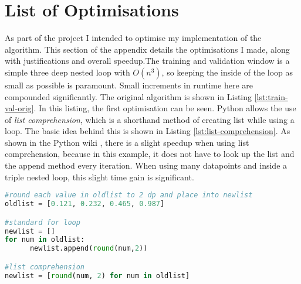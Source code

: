 \documentclass[ oneside,%
                    author={Joshua Felmeden},
                    degree={MEng},
                     title={Sentiment Analysis of Financial Headlines Based on Realised Stock Returns},
                  subtitle={Research}]{dissertation}
\begin{document}


\chapter{List of Optimisations}
\label{appx:optimisations}
As part of the project I intended to optimise my implementation of the algorithm. This section of the appendix details the optimisations I made, along with justifications and overall speedup.The training and validation window is a simple three deep nested loop with $O(n^3)$, so keeping the inside of the loop as small as possible is paramount. Small increments in runtime here are compounded significantly. The original algorithm is shown in Listing \ref{lst:train-val-orig}. In this listing, the first optimisation can be seen. Python allows the use of \textit{list comprehension}, which is a shorthand method of creating list while using a loop. The basic idea behind this is shown in Listing \ref{lst:list-comprehension}. As shown in the Python wiki \cite{list-comprehension}, there is a slight speedup when using list comprehension, because in this example, it does not have to look up the list and the append method every iteration. When using many datapoints and inside a triple nested loop, this slight time gain is significant.

\begin{lstlisting}[float={!htb},caption={List comprehension example},label={lst:list-comprehension},language=Python]
#round each value in oldlist to 2 dp and place into newlist
oldlist = [0.121, 0.232, 0.465, 0.987]

#standard for loop
newlist = []
for num in oldlist:
      newlist.append(round(num,2))

#list comprehension
newlist = [round(num, 2) for num in oldlist]
\end{lstlisting}
\end{document}
